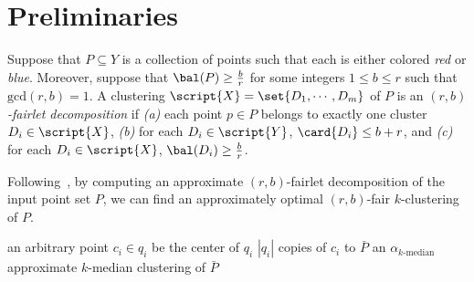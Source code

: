 

\section{Preliminaries}\label{sec:prelim}

\begin{definition}\label{def:fairlet-dec}
Suppose that $P\subseteq Y$ is a collection of points such that each is either colored {\em red} or {\em blue}. Moreover, suppose that $\bal(P) \geq {b\over r}$ for some integers $1\leq b\leq r$ such that $\mathrm{gcd}(r,b)=1$. A clustering $\script{X} = \set{D_1, \cdots, D_m}$ of $P$ is an \emph{$(r,b)$-fairlet decomposition} if \emph{(a)} each point $p\in P$ belongs to exactly one cluster $D_i \in \script{X}$, \emph{(b)} for each $D_i\in \script{Y}$, $\card{D_i} \leq b+r$, and \emph{(c)} for each $D_i \in \script{X}$, $\bal(D_i) \geq {b\over r}$. 
\end{definition}


\iffalse
Following~\cite{chierichetti2017fair}, by computing an approximate $(r,b)$-fairlet decomposition of the input point set $P$, we can find an approximately optimal $(r,b)$-fair $k$-clustering of $P$.

\begin{algorithm}
\caption{The algorithm returns an $(r,b)$-fair $k$-median of $P$ given an ($r,b$)-fairlet decomposition $Q$ of $P$}\label{alg:fairlet-to-clustering}
\begin{algorithmic}[1]
		 an arbitrary point $c_i \in q_i$ be the center of $q_i$
		 $|q_i|$ copies of $c_i$ to $\bar{P}$
	\EndFor
	\State \Return an $\alpha_{k\text{-median}}$ approximate $k$-median clustering of $\bar{P}$
\EndProcedure
\end{algorithmic}
\end{algorithm}


